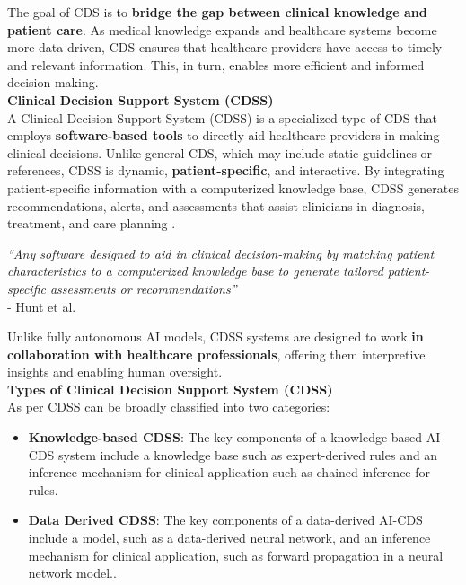 \noindent The goal of CDS is to \textcolor{TUMRed}{\textbf{bridge the gap between clinical knowledge and patient care}}. As medical knowledge expands and healthcare systems become more data-driven, CDS ensures that healthcare providers have access to timely and relevant information. This, in turn, enables more efficient and informed decision-making.\\[\baselineskip]

\noindent \textcolor{TUMBlue}{\textbf{Clinical Decision Support System (CDSS)}}\\
A Clinical Decision Support System (CDSS) is a specialized type of CDS that employs \textcolor{TUMRed}{\textbf{software-based tools}} to directly aid healthcare providers in making clinical decisions. Unlike general CDS, which may include static guidelines or references, CDSS is dynamic, \textcolor{TUMRed}{\textbf{patient-specific}}, and interactive. By integrating patient-specific information with a computerized knowledge base, CDSS generates recommendations, alerts, and assessments that assist clinicians in diagnosis, treatment, and care planning \cite{hunt1998effects}.

\begin{mdframed}[backgroundcolor=black!10]
    \centering
    \textit{“Any software designed to aid in clinical decision-making by matching patient characteristics to a computerized knowledge base to generate tailored patient-specific assessments or recommendations”}\\
    \flushright
    -  Hunt et al. \cite{hunt1998effects}
\end{mdframed}

\noindent Unlike fully autonomous AI models, CDSS systems are designed to work \textcolor{TUMRed}{\textbf{in collaboration with healthcare professionals}}, offering them interpretive insights and enabling human oversight.\\[\baselineskip]

\noindent \textcolor{TUMBlue}{\textbf{Types of Clinical Decision Support System (CDSS)}}\\
As per \cite{visweswaran2022integration} CDSS can be broadly classified into two categories:
\begin{itemize}
    \item \textcolor{TUMRed}{\textbf{Knowledge-based CDSS}}: The key components of a knowledge-based AI-CDS system include a knowledge base such as expert-derived rules and an inference mechanism for clinical application such as chained inference for rules.
    \item \textcolor{TUMRed}{\textbf{Data Derived CDSS}}: The key components of a data-derived AI-CDS include a model, such as a data-derived neural network, and an inference mechanism for clinical application, such as forward propagation in a neural network model..
\end{itemize}


